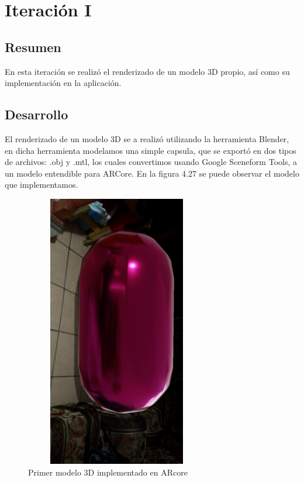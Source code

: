 \section{Iteración I}
\subsection{Resumen}
En esta iteración se realizó el renderizado de un modelo 3D propio, así como su implementación en la aplicación.
\subsection{Desarrollo}
El renderizado de un modelo 3D se a realizó utilizando la herramienta Blender, en dicha herramienta modelamos una simple capsula, que se exportó en dos tipos de archivos: .obj y .mtl, los cuales convertimos usando Google Sceneform Tools, a un modelo entendible para ARCore. En la figura 4.27 se puede observar el modelo que implementamos.
\begin{figure}[H]
	\centering
	\includegraphics[width=8cm,height=12cm]{imagenes/iteraciones/AR2.png}
	\caption{Primer modelo 3D implementado en ARcore}
	\label{fig:1modelo}
\end{figure} 